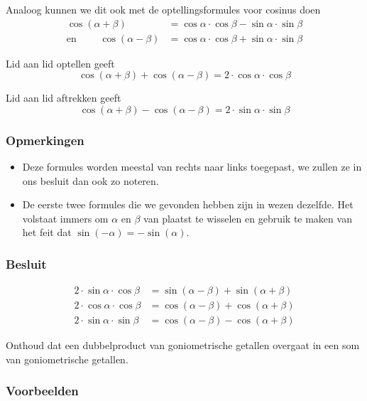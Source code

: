 \documentclass[a4paper,12pt]{article}
\begin{document}
Analoog kunnen we dit ook met de optellingsformules voor cosinus doen
\begin{align*}
                   \cos(\alpha + \beta) &= \cos\alpha\cdot\cos\beta - \sin\alpha\cdot\sin\beta\\
  \mbox{en }\qquad \cos(\alpha - \beta) &= \cos\alpha\cdot\cos\beta + \sin\alpha\cdot\sin\beta
\end{align*}

Lid aan lid optellen geeft
$$\cos(\alpha+\beta) + \cos(\alpha - \beta) = 2\cdot\cos\alpha\cdot\cos\beta$$

Lid aan lid aftrekken geeft
$$\cos(\alpha+\beta) - \cos(\alpha - \beta) = 2\cdot\sin\alpha\cdot\sin\beta$$


\subsubsection*{Opmerkingen}
\begin{itemize}
  \item Deze formules worden meestal van rechts naar links toegepast, we zullen ze in ons besluit dan ook zo noteren.
  \item De eerste twee formules die we gevonden hebben zijn in wezen dezelfde. Het volstaat immers om $\alpha$ en $\beta$ van plaatst te wisselen en gebruik te maken van het feit dat $\sin(-\alpha)=-\sin(\alpha)$.
\end{itemize}


\subsubsection*{Besluit}
\begin{align*}
  2\cdot \sin\alpha\cdot \cos\beta &= \sin(\alpha-\beta)+\sin(\alpha+\beta)\\
  2\cdot \cos\alpha\cdot \cos\beta &= \cos(\alpha-\beta)+\cos(\alpha+\beta)\\
  2\cdot \sin\alpha\cdot \sin\beta &= \cos(\alpha-\beta)-\cos(\alpha+\beta)
\end{align*}

Onthoud dat een dubbelproduct van goniometrische getallen overgaat in een som van goniometrische getallen.

\subsubsection*{Voorbeelden}
\end{document}

